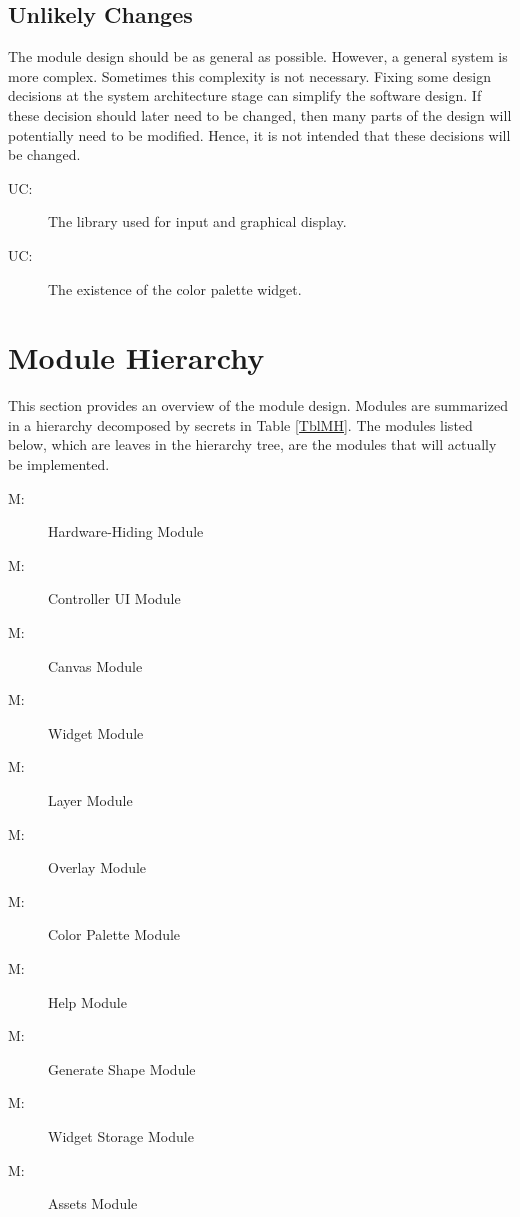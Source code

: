 \documentclass[12pt, titlepage]{article}
\newcounter{ucnum}
\newcommand{\uctheucnum}{UC\theucnum}
\newcounter{mnum}
\newcommand{\mthemnum}{M\themnum}
\begin{document}
\subsection{Unlikely Changes} \label{SecUchange}

The module design should be as general as possible. However, a general system is
more complex. Sometimes this complexity is not necessary. Fixing some design
decisions at the system architecture stage can simplify the software design. If
these decision should later need to be changed, then many parts of the design
will potentially need to be modified. Hence, it is not intended that these
decisions will be changed.

\begin{description}
\item[ \uctheucnum \label{ucIO}:] The library used for input and graphical display.
\item[ \uctheucnum \label{ucPalette}:] The existence of the color palette widget.
\end{description}

\section{Module Hierarchy} \label{SecMH}


This section provides an overview of the module design. Modules are summarized
in a hierarchy decomposed by secrets in Table \ref{TblMH}. The modules listed
below, which are leaves in the hierarchy tree, are the modules that will
actually be implemented.

\begin{description}
\item [ \mthemnum \label{mHH}:] Hardware-Hiding Module
\item [ \mthemnum \label{mUI}:] Controller UI Module
\item [ \mthemnum \label{mCV}:] Canvas Module
\item [ \mthemnum \label{mW}:] Widget Module
\item [ \mthemnum \label{mL}:] Layer Module
\item [ \mthemnum \label{mOL}:] Overlay Module
\item [ \mthemnum \label{mCP}:] Color Palette Module
\item [ \mthemnum \label{mH}:] Help Module
\item [ \mthemnum \label{mGS}:] Generate Shape Module
\item [ \mthemnum \label{mWS}:] Widget Storage Module
\item [ \mthemnum \label{mA}:] Assets Module
\end{description}
\end{document}
